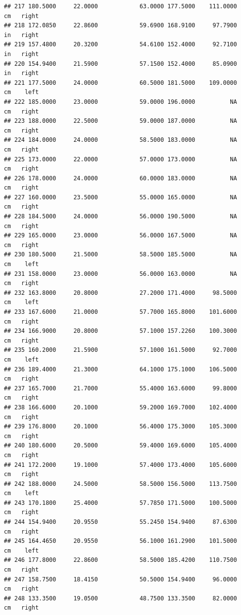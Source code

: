 \documentclass[]{article}
\begin{document}
\begin{verbatim}
## 217 180.5000     22.0000            63.0000 177.5000    111.0000     cm   right
## 218 172.0850     22.8600            59.6900 168.9100     97.7900     in   right
## 219 157.4800     20.3200            54.6100 152.4000     92.7100     in   right
## 220 154.9400     21.5900            57.1500 152.4000     85.0900     in   right
## 221 177.5000     24.0000            60.5000 181.5000    109.0000     cm    left
## 222 185.0000     23.0000            59.0000 196.0000          NA     cm   right
## 223 188.0000     22.5000            59.0000 187.0000          NA     cm   right
## 224 184.0000     24.0000            58.5000 183.0000          NA     cm   right
## 225 173.0000     22.0000            57.0000 173.0000          NA     cm   right
## 226 178.0000     24.0000            60.0000 183.0000          NA     cm   right
## 227 160.0000     23.5000            55.0000 165.0000          NA     cm   right
## 228 184.5000     24.0000            56.0000 190.5000          NA     cm   right
## 229 165.0000     23.0000            56.0000 167.5000          NA     cm   right
## 230 180.5000     21.5000            58.5000 185.5000          NA     cm    left
## 231 158.0000     23.0000            56.0000 163.0000          NA     cm   right
## 232 163.8000     20.8000            27.2000 171.4000     98.5000     cm    left
## 233 167.6000     21.0000            57.7000 165.8000    101.6000     cm   right
## 234 166.9000     20.8000            57.1000 157.2260    100.3000     cm   right
## 235 160.2000     21.5900            57.1000 161.5000     92.7000     cm    left
## 236 189.4000     21.3000            64.1000 175.1000    106.5000     cm   right
## 237 165.7000     21.7000            55.4000 163.6000     99.8000     cm   right
## 238 166.6000     20.1000            59.2000 169.7000    102.4000     cm   right
## 239 176.8000     20.1000            56.4000 175.3000    105.3000     cm   right
## 240 180.6000     20.5000            59.4000 169.6000    105.4000     cm   right
## 241 172.2000     19.1000            57.4000 173.4000    105.6000     cm   right
## 242 188.0000     24.5000            58.5000 156.5000    113.7500     cm    left
## 243 170.1800     25.4000            57.7850 171.5000    100.5000     cm   right
## 244 154.9400     20.9550            55.2450 154.9400     87.6300     cm   right
## 245 164.4650     20.9550            56.1000 161.2900    101.5000     cm    left
## 246 177.8000     22.8600            58.5000 185.4200    110.7500     cm   right
## 247 158.7500     18.4150            50.5000 154.9400     96.0000     cm   right
## 248 133.3500     19.0500            48.7500 133.3500     82.0000     cm   right

\end{verbatim}
\end{document}
